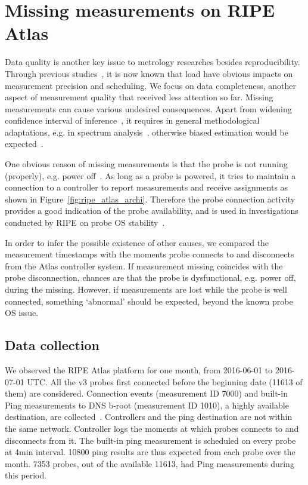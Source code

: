 \section{Missing measurements on RIPE Atlas}
\label{sec:miss_atlas}
Data quality is another key issue to metrology researches besides reproducibility.
Through previous studies~\cite{Holterbach2015a, Bajpai2015}, it is now known that load have obvious impacts on measurement precision and scheduling.
We focus on data completeness, another aspect of measurement quality that received less attention so far. Missing measurements can cause various undesired consequences. 
Apart from widening confidence interval of inference~\cite{Fontugne2016}, it requires in general methodological adaptations, e.g. in spectrum analysis~\cite{Babu2010, Luckie2014, shao2016}, otherwise biased estimation would be expected~\cite{Baraldi2010}.

One obvious reason of missing measurements is that the probe is not running (properly), e.g. power off~\cite{schedule}.
As long as a probe is powered, it tries to maintain a connection to a controller to report measurements and receive assignments as shown in Figure~\ref{fig:ripe_atlas_archi}. 
Therefore the probe connection activity provides a good indication of the probe availability, and is used in investigations conducted by RIPE on probe OS stability~\cite{1look, 2look, 3look}.

In order to infer the possible existence of other causes, we compared the measurement timestamps with the moments probe connects to and disconnects from the Atlas controller system.
If measurement missing coincides with the probe disconnection, chances are that the probe is dysfunctional, e.g. power off,  during the missing. 
However, if measurements are lost while the probe is well connected, something `abnormal' should be expected, beyond the known probe OS issue.

\subsection{Data collection}
We observed the RIPE Atlas platform for one month, from 2016-06-01 to 2016-07-01 UTC.
All the v3 probes first connected before the beginning date (11613 of them) are considered.
Connection events (measurement ID 7000) and built-in Ping measurements to DNS b-root (measurement ID 1010), a highly available destination, are collected~\cite{built-in}. 
Controllers and the ping destination are not within the same network.
Controller logs the moments at which probes connects to and disconnects from it.
The built-in ping measurement is scheduled on every probe at 4min interval. 
10800 ping results are thus expected from each probe over the month.
7353 probes, out of the available 11613, had Ping measurements during this period.


